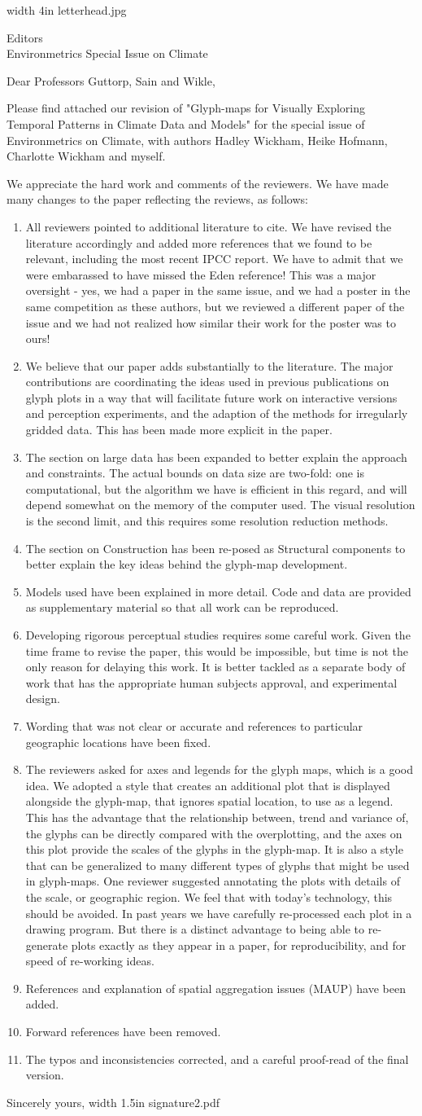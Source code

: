 \documentclass{letter}
\makeatletter
\def\apl#1#2{
\begin{letter}{#1}
\signature{Professor Dianne Cook\\Department of Statistics\\Iowa State University 
\\Ames, Iowa 50011-1210\\ Phone (515) 294 8865\\{\tt dicook@iastate.edu}}
\opening{Dear #2,}

Please find attached our revision of  "Glyph-maps for Visually Exploring Temporal Patterns in Climate Data and Models" for the special issue of Environmetrics on Climate, with authors Hadley Wickham, Heike Hofmann, Charlotte Wickham and myself. 

We appreciate the hard work and comments of the reviewers. We have made many changes to the paper reflecting the reviews, as follows:

\begin{enumerate}
\item All reviewers pointed to additional literature to cite. We have revised the literature accordingly and added more references that we found to be relevant, including the most recent IPCC report.  We have to admit that we were embarassed to have missed the Eden reference! This was a major oversight - yes, we had a paper in the same issue, and we had a poster in the same competition as these authors, but we reviewed a different paper of the issue and we had not realized how similar their work for the poster was to ours! 
\item We believe that our paper adds substantially to the literature. The major contributions are coordinating the ideas used in previous publications on glyph plots in a way that will facilitate future work on interactive versions and perception experiments, and the adaption of the methods for irregularly gridded data.  This has been made more explicit in the paper.
\item The section on large data has been expanded to better explain the approach and constraints. The actual bounds on data size are two-fold: one is computational, but the algorithm we have is efficient in this regard, and will depend somewhat on the memory of the computer used. The visual resolution is the second limit, and this requires some resolution reduction methods.
\item The section on Construction has been re-posed as Structural components to better explain the key ideas behind the glyph-map development.
\item Models used have been explained in more detail. Code and data are provided as supplementary material so that all work can be reproduced.
\item Developing rigorous perceptual studies requires some careful work. Given the time frame to revise the paper, this would be impossible, but time is not the only reason for delaying this work. It is better tackled as a separate body of work that has the appropriate human subjects approval, and experimental design.
\item Wording that was not clear or accurate and references to particular geographic locations have been fixed.
\item The reviewers asked for axes and legends for the glyph maps, which is a good idea. We adopted a style that creates an additional plot that is displayed alongside the glyph-map, that ignores spatial location, to use as a legend. This has the advantage that the relationship between, trend and variance of, the glyphs can be directly compared with the overplotting, and the axes on this plot provide the scales of the glyphs in the glyph-map. It is also a style that can be generalized to many different types of glyphs that might be used in glyph-maps. One reviewer suggested annotating the plots with details of the scale, or geographic region. We feel that with today's technology, this should be avoided. In past years we have carefully re-processed each plot in a drawing program. But there is a distinct advantage to being able to re-generate plots exactly as they appear in a paper, for reproducibility, and for speed of re-working ideas.
\item References and explanation of spatial aggregation issues (MAUP) have been added.
\item Forward references have been removed.
\item The typos and inconsistencies corrected, and a careful proof-read of the final version.
\end{enumerate}

\closing{Sincerely yours,
{\pdfimage width 1.5in {signature2.pdf}}}
\end{letter}}
\makeatother
\begin{document}
{{\pdfimage width 4in {letterhead.jpg}}}
\apl{Editors \\Environmetrics Special Issue on Climate}{Professors Guttorp, Sain and Wikle}
\end{document}
